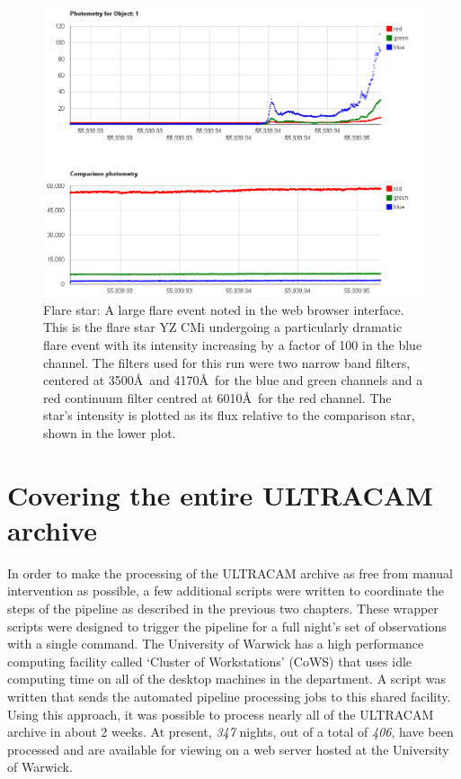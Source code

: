 \begin{figure}
\centering
\includegraphics[width=150mm]{images/ultraflare-on-YZCMi.png}
\caption{Flare star: A large flare event noted in the web browser interface. This is the flare star YZ CMi undergoing a particularly dramatic flare event with its intensity increasing by a factor of 100 in the blue channel. The filters used for this run were two narrow band filters, centered at 3500\AA\  and 4170\AA\  for the blue and green channels and a red continuum filter centred at 6010\AA\  for the red channel. The star's intensity is plotted as its flux relative to the comparison star, shown in the lower plot. }
\label{fig:ultraflare-web}
\end{figure}


\section{Covering the entire ULTRACAM archive}
In order to make the processing of the ULTRACAM archive as free from manual intervention as possible, a few additional scripts were written to coordinate the steps of the pipeline as described in the previous two chapters. These wrapper scripts were designed to trigger the pipeline for a full night's set of observations with a single command. The University of Warwick has a high performance computing facility called `Cluster of Workstations' (CoWS) that uses idle computing time on all of the desktop machines in the department. A script was written that sends the automated pipeline processing jobs to this shared facility. Using this approach, it was possible to process nearly all of the ULTRACAM archive in about 2 weeks. At present, \emph{347} nights, out of a total of \emph{406}, have been processed and are available for viewing on a web server hosted at the University of Warwick. 

